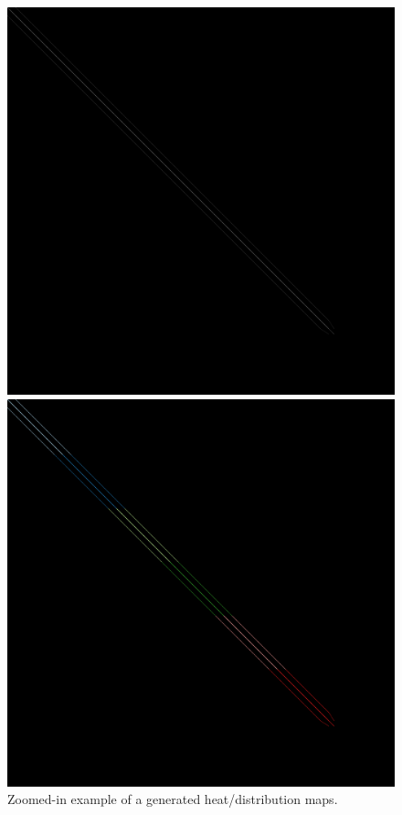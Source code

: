 \documentclass[thesis=M,english]{FITthesis}[2019/12/23]
\begin{document}
\begin{figure}[htp]
    \begin{minipage}{0.5\textwidth}
        \includegraphics[trim=0 2500 2500 0, clip, scale=0.1]{static/e40r5000.png}
    \end{minipage}
    \begin{minipage}{0.5\textwidth}
        \includegraphics[trim=0 2500 2500 0, clip, scale=0.1]{static/e40r5000.dist.png}
    \end{minipage}
    \caption{Zoomed-in example of a generated heat/distribution maps.}
\end{figure}
\end{document}

